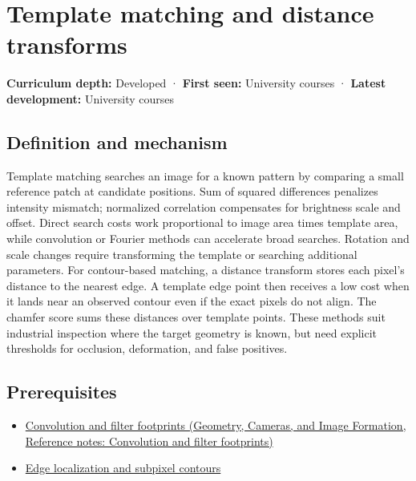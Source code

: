 \hypertarget{appendix-5fb4af80d1c7}{}\label{referencestart:appendix-5fb4af80d1c7}
\section{Template matching and distance transforms}\label{appendix-5fb4af80d1c7-template-matching-and-distance-transforms}

\textbf{Curriculum depth:} Developed · \textbf{First seen:} University courses · \textbf{Latest development:} University courses

\begin{allmightroledefinition}

\subsection{Definition and mechanism}\label{appendix-5fb4af80d1c7-definition-and-mechanism}

Template matching searches an image for a known pattern by comparing a small reference patch at candidate positions. Sum of squared differences penalizes intensity mismatch; normalized correlation compensates for brightness scale and offset. Direct search costs work proportional to image area times template area, while convolution or Fourier methods can accelerate broad searches. Rotation and scale changes require transforming the template or searching additional parameters. For contour-based matching, a distance transform stores each pixel's distance to the nearest edge. A template edge point then receives a low cost when it lands near an observed contour even if the exact pixels do not align. The chamfer score sums these distances over template points. These methods suit industrial inspection where the target geometry is known, but need explicit thresholds for occlusion, deformation, and false positives.

\end{allmightroledefinition}

\subsection{Prerequisites}\label{appendix-5fb4af80d1c7-prerequisites}

\begin{itemize}
\tightlist
\item
  \href{../03-Geometry-Cameras-and-Image-Formation/main.pdf\#nameddest=appendix-d5b3c692d9f0}{Convolution and filter footprints (Geometry, Cameras, and Image Formation, Reference notes: Convolution and filter footprints)}
\item
  \hyperref[appendix-36022286b03e]{Edge localization and subpixel contours}
\end{itemize}


